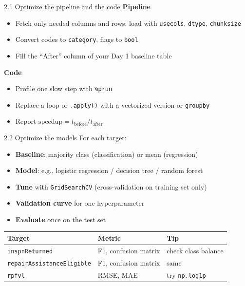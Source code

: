 \documentclass[aspectratio=43,11pt]{beamer}
\begin{document}
\begin{frame}{2.1 Optimize the pipeline and the code}
  \textbf{Pipeline}
  \begin{itemize}
    \item Fetch only needed columns and rows; load with
          \texttt{usecols}, \texttt{dtype}, \texttt{chunksize}
    \item Convert codes to \texttt{category}, flags to \texttt{bool}
    \item Fill the ``After'' column of your Day 1 baseline table
  \end{itemize}
  \vspace{0.5em}
  \textbf{Code}
  \begin{itemize}
    \item Profile one slow step with \texttt{\%prun}
    \item Replace a loop or \texttt{.apply()} with a vectorized version
          or \texttt{groupby}
    \item Report $\text{speedup} = t_{\text{before}} / t_{\text{after}}$
  \end{itemize}
\end{frame}

\begin{frame}{2.2 Optimize the models}
  For each target:
  \vspace{0.3em}
  \begin{itemize}
    \item \textbf{Baseline}: majority class (classification) or mean (regression)
    \item \textbf{Model}: e.g., logistic regression / decision tree / random forest
    \item \textbf{Tune} with \texttt{GridSearchCV} (cross-validation on training set only)
    \item \textbf{Validation curve} for one hyperparameter
    \item \textbf{Evaluate} once on the test set
  \end{itemize}
  \vspace{0.5em}
  \begin{center}
  \footnotesize
  \begin{tabular}{@{}lll@{}}
    \toprule
    Target & Metric & Tip \\
    \midrule
    \texttt{inspnReturned} & F1, confusion matrix & check class balance \\
    \texttt{repairAssistanceEligible} & F1, confusion matrix & same \\
    \texttt{rpfvl} & RMSE, MAE & try \texttt{np.log1p} \\
    \bottomrule
  \end{tabular}
  \end{center}
\end{frame}
\end{document}
